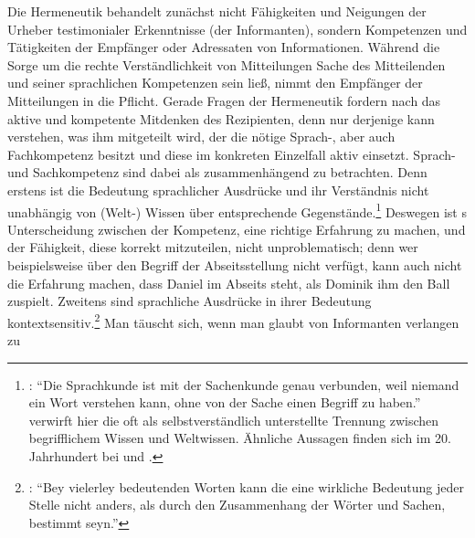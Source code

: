 Die Hermeneutik behandelt zunächst nicht Fähigkeiten und Neigungen der Urheber
testimonialer Erkenntnisse (der Informanten), sondern Kompetenzen und
Tätigkeiten der Empfänger oder Adressaten von Informationen. Während
 die Sorge um die rechte Verständlichkeit
von Mitteilungen Sache des Mitteilenden und seiner sprachlichen Kompetenzen sein
ließ, nimmt
den Empfänger der Mitteilungen in die Pflicht. Gerade Fragen der Hermeneutik fordern nach
das aktive und kompetente Mitdenken des Rezipienten, denn nur
derjenige kann verstehen, was ihm mitgeteilt wird, der die nötige Sprach-, aber
auch Fachkompetenz besitzt und diese im konkreten Einzelfall aktiv einsetzt.
Sprach- und Sachkompetenz sind dabei als zusammenhängend zu betrachten. Denn
erstens ist die Bedeutung sprachlicher Ausdrücke und ihr Verständnis nicht
unabhängig von \mbox{(Welt-)} Wissen über entsprechende
Gegenstände.\footnote{\cite[Vgl.][\S~256]{Reimarus:DieVernunftlehrealseineAnweisungzumrichtigenGebrauchderVernunftinderErkenntnisderWahrheit1756}:
\enquote{Die Sprachkunde ist mit der Sachenkunde genau verbunden, weil niemand
ein Wort verstehen kann, ohne von der Sache einen Begriff zu haben.}
 verwirft hier die oft als selbstverständlich unterstellte
Trennung zwischen begrifflichem Wissen und Weltwissen. Ähnliche Aussagen finden
sich im 20. Jahrhundert bei \textcite{Quine:TwoDogmasofEmpiricism1951} und
\cite{Davidson:OntheVeryIdeaofaConceptualScheme1974}.} Deswegen ist
s Unterscheidung zwischen der Kompetenz,
eine richtige Erfahrung zu machen, und der Fähigkeit, diese korrekt mitzuteilen,
nicht unproblematisch; denn wer beispielsweise über den Begriff der Abseitsstellung
nicht verfügt, kann auch nicht die Erfahrung machen, dass Daniel im Abseits
steht, als Dominik ihm den Ball zuspielt. Zweitens sind sprachliche Ausdrücke in
ihrer Bedeutung
kontextsensitiv.\footnote{\cite[Vgl.][\S~257]{Reimarus:DieVernunftlehrealseineAnweisungzumrichtigenGebrauchderVernunftinderErkenntnisderWahrheit1756}:
\enquote{Bey vielerley bedeutenden Worten kann die eine wirkliche Bedeutung
jeder Stelle nicht anders, als durch den Zusammenhang der Wörter und Sachen,
bestimmt seyn.}} Man täuscht sich, wenn man glaubt von Informanten verlangen zu
